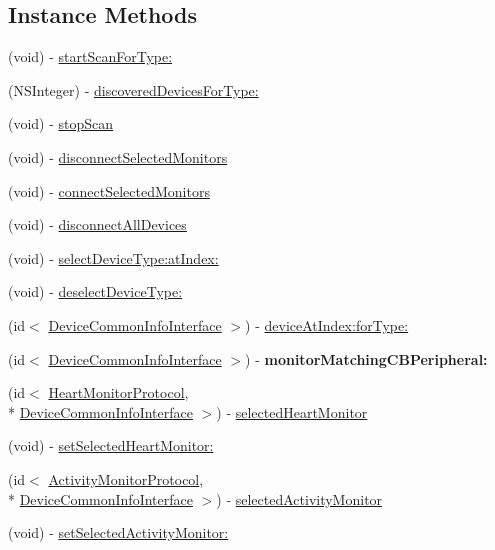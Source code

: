 \subsection*{Instance Methods}
\begin{DoxyCompactItemize}
\item 
(void) -\/ \hyperlink{interface_b_t_device_manager_a8ccfdb80e7396a787703df2e2145783b}{start\-Scan\-For\-Type\-:}
\item 
(N\-S\-Integer) -\/ \hyperlink{interface_b_t_device_manager_af88f5d1516142ed353cdcac2268dadfb}{discovered\-Devices\-For\-Type\-:}
\item 
(void) -\/ \hyperlink{interface_b_t_device_manager_a77d4c5c16c2e82bed7e5f2f65bcd2dfb}{stop\-Scan}
\item 
(void) -\/ \hyperlink{interface_b_t_device_manager_ae310a606d4e735e7813319e366f67aa2}{disconnect\-Selected\-Monitors}
\item 
(void) -\/ \hyperlink{interface_b_t_device_manager_afda16d6654df9d6eddde47c5a3ae38ec}{connect\-Selected\-Monitors}
\item 
(void) -\/ \hyperlink{interface_b_t_device_manager_aee2928325606cb3f338a5ecb8ef35560}{disconnect\-All\-Devices}
\item 
(void) -\/ \hyperlink{interface_b_t_device_manager_af3f435a6fec885eca732034a12239504}{select\-Device\-Type\-:at\-Index\-:}
\item 
(void) -\/ \hyperlink{interface_b_t_device_manager_a916adc15288fd7428a30954a57f0af0a}{deselect\-Device\-Type\-:}
\item 
(id$<$ \hyperlink{protocol_device_common_info_interface-p}{Device\-Common\-Info\-Interface} $>$) -\/ \hyperlink{interface_b_t_device_manager_a84c51142e50c343ffa90c5bf9afee48b}{device\-At\-Index\-:for\-Type\-:}
\item 
\hypertarget{interface_b_t_device_manager_af11257d463445c307cd38c9e284c6826}{(id$<$ \hyperlink{protocol_device_common_info_interface-p}{Device\-Common\-Info\-Interface} $>$) -\/ {\bfseries monitor\-Matching\-C\-B\-Peripheral\-:}}\label{interface_b_t_device_manager_af11257d463445c307cd38c9e284c6826}

\item 
(id$<$ \hyperlink{protocol_heart_monitor_protocol-p}{Heart\-Monitor\-Protocol}, \\*
\hyperlink{protocol_device_common_info_interface-p}{Device\-Common\-Info\-Interface} $>$) -\/ \hyperlink{interface_b_t_device_manager_a1c4ad74783cb71a008c926f2e5ec3835}{selected\-Heart\-Monitor}
\item 
(void) -\/ \hyperlink{interface_b_t_device_manager_a005786995ec17c9a94e85a882bfd4896}{set\-Selected\-Heart\-Monitor\-:}
\item 
(id$<$ \hyperlink{protocol_activity_monitor_protocol-p}{Activity\-Monitor\-Protocol}, \\*
\hyperlink{protocol_device_common_info_interface-p}{Device\-Common\-Info\-Interface} $>$) -\/ \hyperlink{interface_b_t_device_manager_aaca0fdc9335bbc7465e91ad0f5c4dbb2}{selected\-Activity\-Monitor}
\item 
(void) -\/ \hyperlink{interface_b_t_device_manager_a6d8e2982b9a3ad004563736f89d98cb1}{set\-Selected\-Activity\-Monitor\-:}
\end{DoxyCompactItemize}
